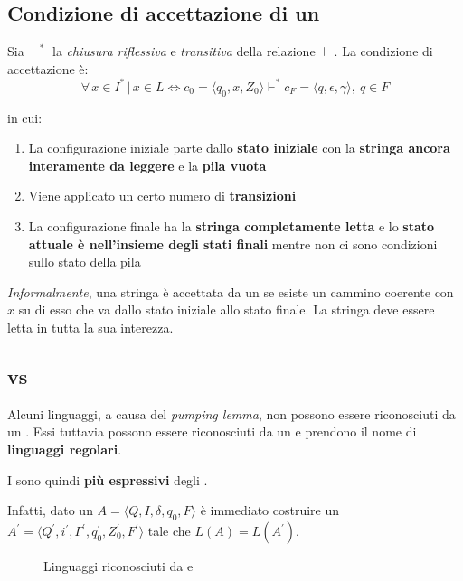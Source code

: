 \documentclass[italian, 10pt]{article}
\begin{document}
\subsection{Condizione di accettazione di un \PDA}

Sia \(\vdash^\ast\) la \textit{chiusura riflessiva} e \textit{transitiva} della relazione \(\vdash\).
La condizione di accettazione è:
\[ \forall \, x \in I^\ast \, | \, x \in L \Leftrightarrow c_0 = \langle q_0, x, Z_0 \rangle \vdash^\ast c_F = \langle q, \epsilon, \gamma \rangle, \ q \in F \]

in cui:
\begin{enumerate}
  \item La configurazione iniziale parte dallo \textbf{stato iniziale} con la \textbf{stringa ancora interamente da leggere} e la \textbf{pila vuota}
  \item Viene applicato un certo numero di \textbf{transizioni}
  \item La configurazione finale ha la \textbf{stringa completamente letta} e lo \textbf{stato attuale è nell'insieme degli stati finali} mentre non ci sono condizioni sullo stato della pila
\end{enumerate}

\textit{Informalmente}, una stringa è accettata da un \PDA se esiste un cammino coerente con \(x\) su di esso che va dallo stato iniziale allo stato finale.
La stringa deve essere letta in tutta la sua interezza.

\subsection{\PDA vs \FSA}

Alcuni linguaggi, a causa del \textit{pumping lemma}, non possono essere riconosciuti da un \FSA.
Essi tuttavia possono essere riconosciuti da un \PDA e prendono il nome di \textbf{linguaggi regolari}.

I \PDA sono quindi \textbf{più espressivi} degli \FSA.

Infatti, dato un \FSA \(A = \langle Q, I, \delta, q_0, F \rangle\) è immediato costruire un \PDA \(A^\prime  = \langle Q^\prime , i^\prime , \Gamma^\prime , q_0^\prime , Z_0^\prime , F^\prime  \rangle \) tale che \(L(A) = L(A^\prime )\).

\begin{figure}[htbp]
  \bigskip
  \centering
  \caption{Linguaggi riconosciuti da \PDA e \FSA}
  \label{fig:PDA-vs-FSA}
  \bigskip
\end{figure}
\end{document}
